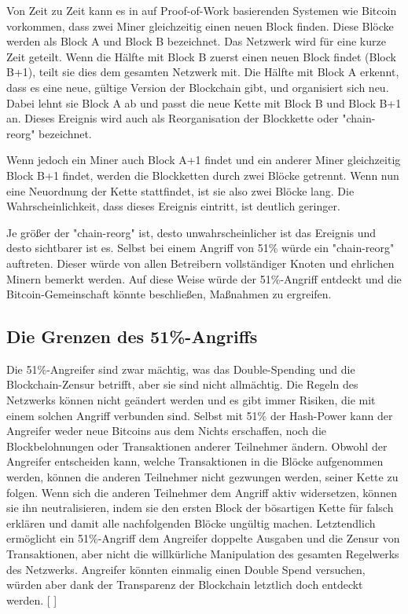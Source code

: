 \documentclass[ngerman]{scrreprt}
\begin{document}
Von Zeit zu Zeit kann es in auf Proof-of-Work basierenden Systemen wie Bitcoin vorkommen, dass zwei Miner gleichzeitig einen neuen Block finden. Diese Blöcke werden als Block A und Block B bezeichnet. Das Netzwerk wird für eine kurze Zeit geteilt. Wenn die Hälfte mit Block B zuerst einen neuen Block findet (Block B+1), teilt sie dies dem gesamten Netzwerk mit. Die Hälfte mit Block A erkennt, dass es eine neue, gültige Version der Blockchain gibt, und organisiert sich neu. Dabei lehnt sie Block A ab und passt die neue Kette mit Block B und Block B+1 an. Dieses Ereignis wird auch als Reorganisation der Blockkette oder "chain-reorg" bezeichnet.

Wenn jedoch ein Miner auch Block A+1 findet und ein anderer Miner gleichzeitig Block B+1 findet, werden die Blockketten durch zwei Blöcke getrennt. Wenn nun eine Neuordnung der Kette stattfindet, ist sie also zwei Blöcke lang. Die Wahrscheinlichkeit, dass dieses Ereignis eintritt, ist deutlich geringer.

Je größer der "chain-reorg" ist, desto unwahrscheinlicher ist das Ereignis und desto sichtbarer ist es. Selbst bei einem Angriff von 51\% würde ein "chain-reorg" auftreten. Dieser würde von allen Betreibern vollständiger Knoten und ehrlichen Minern bemerkt werden. Auf diese Weise würde der 51\%-Angriff entdeckt und die Bitcoin-Gemeinschaft könnte beschließen, Maßnahmen zu ergreifen.

\subsection{Die Grenzen des 51\%-Angriffs}
Die 51\%-Angreifer sind zwar mächtig, was das Double-Spending und die Blockchain-Zensur betrifft, aber sie sind nicht allmächtig. Die Regeln des Netzwerks können nicht geändert werden und es gibt immer Risiken, die mit einem solchen Angriff verbunden sind. Selbst mit 51\% der Hash-Power kann der Angreifer weder neue Bitcoins aus dem Nichts erschaffen, noch die Blockbelohnungen oder Transaktionen anderer Teilnehmer ändern. Obwohl der Angreifer entscheiden kann, welche Transaktionen in die Blöcke aufgenommen werden, können die anderen Teilnehmer nicht gezwungen werden, seiner Kette zu folgen. Wenn sich die anderen Teilnehmer dem Angriff aktiv widersetzen, können sie ihn neutralisieren, indem sie den ersten Block der bösartigen Kette für falsch erklären und damit alle nachfolgenden Blöcke ungültig machen. Letztendlich ermöglicht ein 51\%-Angriff dem Angreifer doppelte Ausgaben und die Zensur von Transaktionen, aber nicht die willkürliche Manipulation des gesamten Regelwerks des Netzwerks. Angreifer könnten einmalig einen Double Spend versuchen, würden aber dank der Transparenz der Blockchain letztlich doch entdeckt werden. [ \cite{51attack} ]
\end{document}
